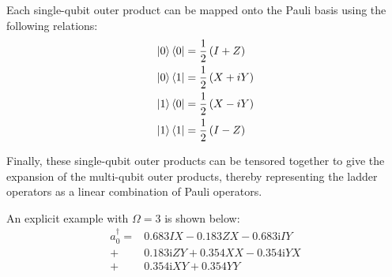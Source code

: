 Each single-qubit outer product can be mapped onto the Pauli basis using the following relations:
\begin{align}
    \ket{0}\bra{0} &= \frac12 \left(I + Z \right)\\
    \ket{0}\bra{1} &= \frac12 \left(X + iY \right)\\
    \ket{1}\bra{0} &= \frac12 \left(X - iY \right)\\
    \ket{1}\bra{1} &= \frac12 \left(I - Z \right)\\ 
\end{align}

Finally, these single-qubit outer products can be tensored together to give the expansion of the multi-qubit outer products, thereby representing the ladder operators as a linear combination of Pauli operators.

An explicit example with $\Omega = 3$ is shown below: 
\begin{align}
    a_0^\dagger = &0.683IX -0.183 ZX - 0.683\mathrm{i} IY \\
                + &0.183\mathrm{i} ZY +0.354 XX - 0.354\mathrm{i} YX \\
                + &0.354\mathrm{i} XY + 0.354 YY
\end{align}